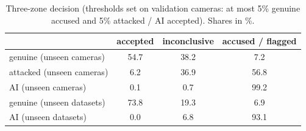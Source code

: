 \begin{table}[t]\centering\small\caption{Three-zone decision (thresholds set on validation cameras: at most 5\% genuine accused and 5\% attacked / AI accepted). Shares in \%.}\label{tab:zones}
\begin{tabular}{lccc}
\toprule
 & accepted & inconclusive & accused / flagged \\
\midrule
genuine (unseen cameras) & 54.7 & 38.2 & 7.2 \\
attacked (unseen cameras) & 6.2 & 36.9 & 56.8 \\
AI (unseen cameras) & 0.1 & 0.7 & 99.2 \\
genuine (unseen datasets) & 73.8 & 19.3 & 6.9 \\
AI (unseen datasets) & 0.0 & 6.8 & 93.1 \\
\bottomrule
\end{tabular}
\end{table}
